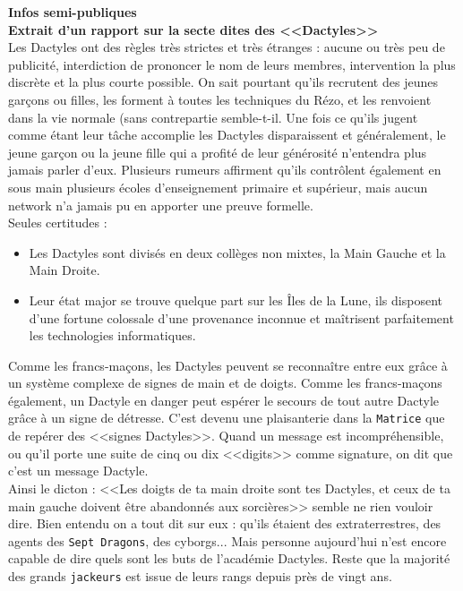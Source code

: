 \documentclass[11pt,twoside,a4paper]{article}
\begin{document}
\begin{multicols*}{3}
{\textbf{Infos semi-publiques}~\\

\textbf{Extrait d'un rapport sur la secte dites des <<Dactyles>> }~\\

Les Dactyles ont des r{\`e}gles tr{\`e}s strictes et tr{\`e}s {\'e}tranges : aucune ou tr{\`e}s peu de publicit{\'e}, interdiction de prononcer le nom de leurs membres, intervention la plus discr{\`e}te et la plus courte possible. On sait pourtant qu'ils recrutent des jeunes gar\c{c}ons ou filles, les forment {\`a} toutes les techniques du R{\'e}zo, et les renvoient dans la vie normale (sans contrepartie semble-t-il. Une fois ce qu'ils jugent comme {\'e}tant leur t{\^a}che accomplie les Dactyles disparaissent et g{\'e}n{\'e}ralement, le jeune gar\c{c}on ou la jeune fille qui a profit{\'e} de leur g{\'e}n{\'e}rosit{\'e} n'entendra plus jamais parler d'eux. Plusieurs rumeurs affirment qu'ils contr{\^o}lent {\'e}galement en sous main plusieurs {\'e}coles d'enseignement primaire et sup{\'e}rieur, mais aucun network n'a jamais pu en apporter une preuve formelle.~\\

Seules certitudes :
\begin{itemize}
	\item Les Dactyles sont divis{\'e}s en deux coll{\`e}ges non mixtes, la Main Gauche et la Main Droite. 
	\item Leur {\'e}tat major se trouve quelque part sur les {\^I}les de la Lune, ils disposent d'une fortune colossale d'une provenance inconnue et ma{\^i}trisent parfaitement les technologies informatiques.
\end{itemize}

\columnbreak

Comme les francs-ma\c{c}ons, les Dactyles peuvent se reconna{\^i}tre entre eux gr{\^a}ce {\`a} un syst{\`e}me complexe de signes de main et de doigts. Comme  les francs-ma\c{c}ons {\'e}galement, un Dactyle en danger peut esp{\'e}rer le secours de tout autre Dactyle gr{\^a}ce {\`a} un signe de d{\'e}tresse. C'est devenu une plaisanterie dans la \texttt{Matrice} que de rep{\'e}rer des <<signes Dactyles>>. Quand un message est incompr{\'e}hensible, ou qu'il porte une suite de cinq ou dix <<digits>> comme signature, on dit que c'est un message Dactyle.~\\

Ainsi le dicton : <<Les doigts de ta main droite sont tes Dactyles, et ceux de ta main gauche doivent {\^e}tre abandonn{\'e}s aux sorci{\`e}res>> semble ne rien vouloir dire. Bien entendu on a tout dit sur eux : qu'ils {\'e}taient des extraterrestres, des agents des \texttt{Sept Dragons}, des cyborgs... Mais personne aujourd'hui n'est encore capable de dire quels sont les buts de l'acad{\'e}mie Dactyles. Reste que la majorit{\'e} des grands \texttt{jackeurs} est issue de leurs rangs depuis pr{\`e}s de vingt ans.~\\

}
\end{multicols*}
\end{document}
